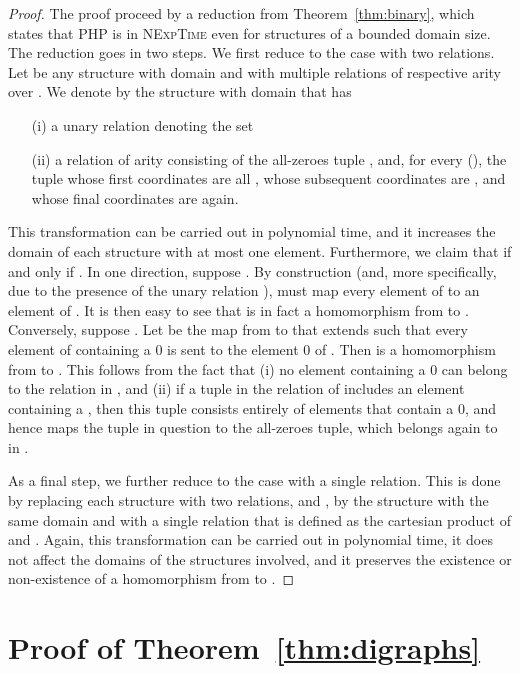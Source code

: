 \documentclass{article}
\newcommand{\nexptime}{\textsc{NExpTime}\xspace}
\begin{document}
\begin{proof}
The proof proceed by a reduction from Theorem~\ref{thm:binary},
 which states that PHP is in \nexptime even
  for structures of a bounded domain size.  The reduction goes in two steps.
  We first reduce to the case with two
  relations. Let  be any structure  with domain  and with multiple relations
   of respective arity  over .
  We denote by  the structure with domain 
  that has 
\begin{enumerate}
\item[(i)] a unary relation  denoting the set 
\item[(ii)] a relation  of arity
    consisting of 
   the all-zeroes tuple , and, 
   for every  (), the tuple whose first  coordinates
   are all , whose subsequent  coordinates are ,  and whose final  coordinates are 
   again.
\end{enumerate}
This transformation can be carried out in
  polynomial time, and it increases the domain of each structure with
  at most one element. Furthermore, we claim that
   if and
  only if . 
In one direction, suppose . By
  construction (and, more specifically, due to the presence of the
  unary relation ),  must map every element of  to
  an element of . It is then easy to see that  is in fact a
  homomorphism from  to . 
  Conversely, suppose . Let  be the map from 
  to  that extends  such that every element of 
  containing a 0 is sent to the element 0 of . 
  Then  is a homomorphism from 
   to . This follows from 
  the fact that (i) no element containing a 0 can 
  belong to the  relation in , 
  and (ii) if a tuple in the relation  of 
  includes an element containing a , then this
  tuple consists entirely of elements that contain a 0, 
  and hence  maps the tuple in question to 
  the all-zeroes tuple, which belongs again to  in .

  As a final step, we further reduce to the case with a single relation.
  This is done by replacing each structure with two relations,  and
  , by the structure with the same domain and with a single
  relation that is defined as the cartesian product of  and . 
  Again, this transformation can be carried out in polynomial time,
  it does not affect the domains of the structures involved, and
  it preserves the existence or non-existence of a homomorphism
  from  to .  
\end{proof}







\section{Proof of Theorem~\ref{thm:digraphs}}
\end{document}
